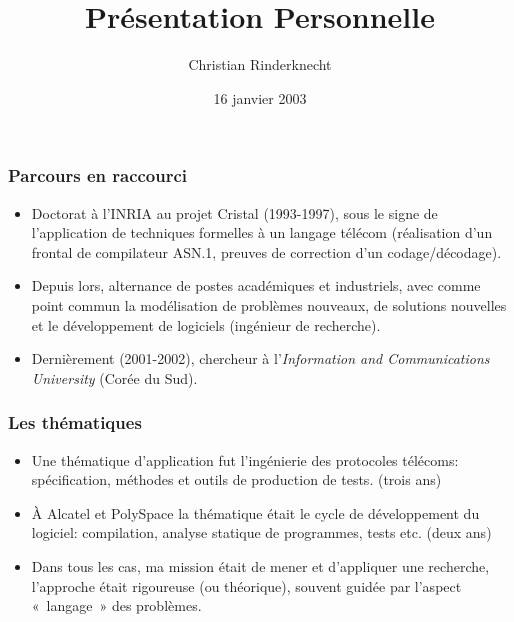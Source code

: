 \documentclass[compress,dvips,xcolor={dvipsnames},t]{beamer}
\title{Présentation Personnelle}
\author{Christian Rinderknecht}
\date{16 janvier 2003}
\begin{document}
\frame{\maketitle}


\begin{frame}
\frametitle{Parcours en raccourci}

\begin{itemize}
  \item Doctorat à l'INRIA au projet Cristal (1993-1997),
        sous le signe de l'application de techniques formelles à un
        langage télécom (réalisation d'un frontal de compilateur
        \mbox{ASN.1}, preuves de correction d'un codage/décodage).

  \item Depuis lors, alternance de postes académiques et industriels,
        avec comme point commun la modélisation de problèmes nouveaux,
        de solutions nouvelles et le développement de logiciels
        (ingénieur de recherche).

  \item Dernièrement (2001-2002), chercheur à l'\emph{Information and
        Communications University} (Corée du Sud).

\end{itemize}
\end{frame}


\begin{frame}
\frametitle{Les thématiques}

\begin{itemize}
  \item Une thématique d'application fut l'ingénierie des protocoles
        télécoms: spécification, méthodes et outils de production
        de tests. (trois ans)

  \item À Alcatel et PolySpace la thématique était le cycle de
        développement du logiciel: compilation, analyse statique de
        programmes, tests etc. (deux ans)

  \item Dans tous les cas, ma mission était de mener et d'appliquer
        une recherche, l'approche était rigoureuse (ou théorique),
        souvent guidée par l'aspect «~langage~» des problèmes.

\end{itemize}
\end{frame}
\end{document}
